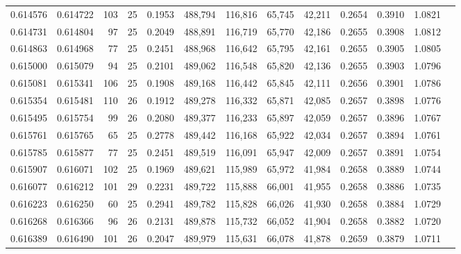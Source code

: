 \begin{tabular}{rrrrrrrrrrrrr}
0.614576 & 0.614722 &    103 &    25 &                                     0.1953 & 488,794 & 116,816 &  65,745 &  42,211 & 0.2654 & 0.3910 & 1.0821 \\
0.614731 & 0.614804 &     97 &    25 &                                     0.2049 & 488,891 & 116,719 &  65,770 &  42,186 & 0.2655 & 0.3908 & 1.0812 \\
0.614863 & 0.614968 &     77 &    25 &                                     0.2451 & 488,968 & 116,642 &  65,795 &  42,161 & 0.2655 & 0.3905 & 1.0805 \\
0.615000 & 0.615079 &     94 &    25 &                                     0.2101 & 489,062 & 116,548 &  65,820 &  42,136 & 0.2655 & 0.3903 & 1.0796 \\
0.615081 & 0.615341 &    106 &    25 &                                     0.1908 & 489,168 & 116,442 &  65,845 &  42,111 & 0.2656 & 0.3901 & 1.0786 \\
0.615354 & 0.615481 &    110 &    26 &                                     0.1912 & 489,278 & 116,332 &  65,871 &  42,085 & 0.2657 & 0.3898 & 1.0776 \\
0.615495 & 0.615754 &     99 &    26 &                                     0.2080 & 489,377 & 116,233 &  65,897 &  42,059 & 0.2657 & 0.3896 & 1.0767 \\
0.615761 & 0.615765 &     65 &    25 &                                     0.2778 & 489,442 & 116,168 &  65,922 &  42,034 & 0.2657 & 0.3894 & 1.0761 \\
0.615785 & 0.615877 &     77 &    25 &                                     0.2451 & 489,519 & 116,091 &  65,947 &  42,009 & 0.2657 & 0.3891 & 1.0754 \\
0.615907 & 0.616071 &    102 &    25 &                                     0.1969 & 489,621 & 115,989 &  65,972 &  41,984 & 0.2658 & 0.3889 & 1.0744 \\
0.616077 & 0.616212 &    101 &    29 &                                     0.2231 & 489,722 & 115,888 &  66,001 &  41,955 & 0.2658 & 0.3886 & 1.0735 \\
0.616223 & 0.616250 &     60 &    25 &                                     0.2941 & 489,782 & 115,828 &  66,026 &  41,930 & 0.2658 & 0.3884 & 1.0729 \\
0.616268 & 0.616366 &     96 &    26 &                                     0.2131 & 489,878 & 115,732 &  66,052 &  41,904 & 0.2658 & 0.3882 & 1.0720 \\
0.616389 & 0.616490 &    101 &    26 &                                     0.2047 & 489,979 & 115,631 &  66,078 &  41,878 & 0.2659 & 0.3879 & 1.0711 \\

\end{tabular}
